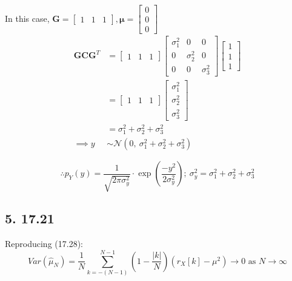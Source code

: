 \documentclass[12pt]{article}
\begin{document}
\noindent
In this case, $\mathbf{G} = \begin{bmatrix} 1 & 1 & 1 \end{bmatrix}, \bm{\mu} = \begin{bmatrix} 0 \\ 0 \\ 0 \end{bmatrix}$
\begin{align*}
  \mathbf{GCG}^T &= \begin{bmatrix} 1 & 1 & 1 \end{bmatrix} \begin{bmatrix} \sigma_1^2 & 0 & 0 \\ 0 & \sigma_2^2 & 0 \\ 0 & 0 & \sigma_3^2 \end{bmatrix} \begin{bmatrix} 1 \\ 1 \\ 1 \end{bmatrix} \\[8pt]
  &= \begin{bmatrix} 1 & 1 & 1 \end{bmatrix} \begin{bmatrix} \sigma_1^2 \\ \sigma_2^2 \\ \sigma_3^2 \end{bmatrix}\\[8pt]
  &= \sigma_1^2 + \sigma_2^2 + \sigma_3^2\\[8pt]
  \implies y &\sim \mathcal{N}(0,\ \sigma_1^2 + \sigma_2^2 + \sigma_3^2)
\end{align*}

\noindent
\[
\therefore p_Y(y) = \frac{1}{\sqrt{2\pi\sigma_y^2}} \cdot \exp\left( \frac{-y^2}{2\sigma_y^2} \right);\ \sigma_y^2 = \sigma_1^2 + \sigma_2^2 + \sigma_3^2
\]

\subsection*{5. 17.21}
\label{subsec:1.5}

\noindent
Reproducing (17.28): \\[8pt]
\[
Var(\hat{\mu}_N) = \frac{1}{N} \sum_{k=-(N-1)}^{N-1} \left( 1 - \frac{|k|}{N} \right) (r_X[k] - \mu^2) \rightarrow 0 \text{ as } N \rightarrow \infty
\]
\end{document}
